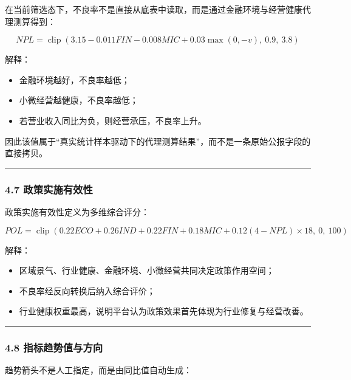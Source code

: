 \documentclass[
]{article}
\providecommand{\tightlist}{%
  \setlength{\itemsep}{0pt}\setlength{\parskip}{0pt}}
\begin{document}
在当前筛选态下，不良率不是直接从底表中读取，而是通过金融环境与经营健康代理测算得到：

\[
NPL = \operatorname{clip}\left(3.15 - 0.011FIN - 0.008MIC + 0.03\max(0,-v),\ 0.9,\ 3.8\right)
\]

解释：

\begin{itemize}
\tightlist
\item
  金融环境越好，不良率越低；
\item
  小微经营越健康，不良率越低；
\item
  若营业收入同比为负，则经营承压，不良率上升。
\end{itemize}

因此该值属于``真实统计样本驱动下的代理测算结果''，而不是一条原始公报字段的直接拷贝。

\begin{center}\rule{0.5\linewidth}{0.5pt}\end{center}

\subsubsection{4.7
政策实施有效性}\label{ux653fux7b56ux5b9eux65bdux6709ux6548ux6027}

政策实施有效性定义为多维综合评分：

\[
POL = \operatorname{clip}\left(0.22ECO + 0.26IND + 0.22FIN + 0.18MIC + 0.12(4-NPL)\times 18,\ 0,\ 100\right)
\]

解释：

\begin{itemize}
\tightlist
\item
  区域景气、行业健康、金融环境、小微经营共同决定政策作用空间；
\item
  不良率经反向转换后纳入综合评价；
\item
  行业健康权重最高，说明平台认为政策效果首先体现为行业修复与经营改善。
\end{itemize}

\begin{center}\rule{0.5\linewidth}{0.5pt}\end{center}

\subsubsection{4.8
指标趋势值与方向}\label{ux6307ux6807ux8d8bux52bfux503cux4e0eux65b9ux5411}

趋势箭头不是人工指定，而是由同比值自动生成：
\end{document}
